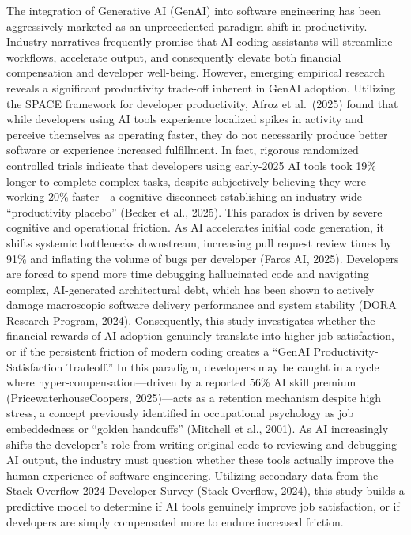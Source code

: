 \documentclass[
]{article}
\begin{document}
The integration of Generative AI (GenAI) into software engineering has
been aggressively marketed as an unprecedented paradigm shift in
productivity. Industry narratives frequently promise that AI coding
assistants will streamline workflows, accelerate output, and
consequently elevate both financial compensation and developer
well-being. However, emerging empirical research reveals a significant
productivity trade-off inherent in GenAI adoption. Utilizing the SPACE
framework for developer productivity, Afroz et al.~(2025) found that
while developers using AI tools experience localized spikes in activity
and perceive themselves as operating faster, they do not necessarily
produce better software or experience increased fulfillment. In fact,
rigorous randomized controlled trials indicate that developers using
early-2025 AI tools took 19\% longer to complete complex tasks, despite
subjectively believing they were working 20\% faster---a cognitive
disconnect establishing an industry-wide ``productivity placebo''
(Becker et al., 2025). This paradox is driven by severe cognitive and
operational friction. As AI accelerates initial code generation, it
shifts systemic bottlenecks downstream, increasing pull request review
times by 91\% and inflating the volume of bugs per developer (Faros AI,
2025). Developers are forced to spend more time debugging hallucinated
code and navigating complex, AI-generated architectural debt, which has
been shown to actively damage macroscopic software delivery performance
and system stability (DORA Research Program, 2024). Consequently, this
study investigates whether the financial rewards of AI adoption
genuinely translate into higher job satisfaction, or if the persistent
friction of modern coding creates a ``GenAI Productivity-Satisfaction
Tradeoff.'' In this paradigm, developers may be caught in a cycle where
hyper-compensation---driven by a reported 56\% AI skill premium
(PricewaterhouseCoopers, 2025)---acts as a retention mechanism despite
high stress, a concept previously identified in occupational psychology
as job embeddedness or ``golden handcuffs'' (Mitchell et al., 2001). As
AI increasingly shifts the developer's role from writing original code
to reviewing and debugging AI output, the industry must question whether
these tools actually improve the human experience of software
engineering. Utilizing secondary data from the Stack Overflow 2024
Developer Survey (Stack Overflow, 2024), this study builds a predictive
model to determine if AI tools genuinely improve job satisfaction, or if
developers are simply compensated more to endure increased friction.
\end{document}
